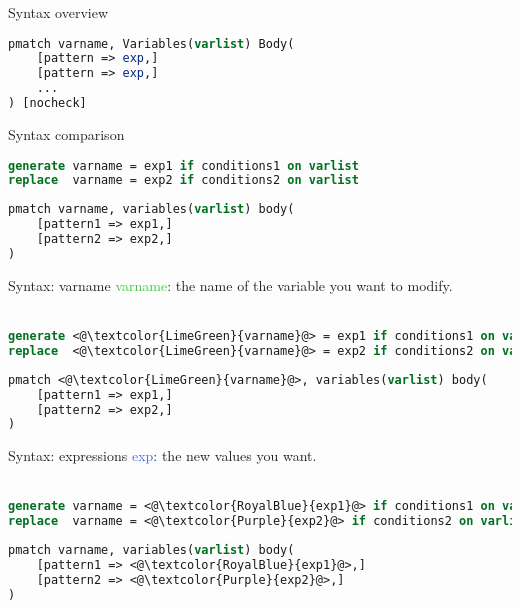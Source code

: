 \documentclass[11pt]{beamer}
\begin{document}
\begin{frame}[fragile]{Syntax overview}
\begin{lstlisting}[language=Stata]
pmatch varname, Variables(varlist) Body(
    [pattern => exp,]
    [pattern => exp,]
    ...
) [nocheck]
\end{lstlisting}
\end{frame}

\begin{frame}[fragile]{Syntax comparison}
\begin{lstlisting}[language=Stata]
generate varname = exp1 if conditions1 on varlist
replace  varname = exp2 if conditions2 on varlist
\end{lstlisting}

\begin{lstlisting}[language=Stata]
pmatch varname, variables(varlist) body(
    [pattern1 => exp1,]
    [pattern2 => exp2,]
)
\end{lstlisting}
\end{frame}

\begin{frame}[fragile]{Syntax: varname}
\textcolor{LimeGreen}{varname}: the name of the variable you want to modify. \\~

\begin{lstlisting}[language=Stata]
generate <@\textcolor{LimeGreen}{varname}@> = exp1 if conditions1 on varlist
replace  <@\textcolor{LimeGreen}{varname}@> = exp2 if conditions2 on varlist
\end{lstlisting}

\begin{lstlisting}[language=Stata]
pmatch <@\textcolor{LimeGreen}{varname}@>, variables(varlist) body(
    [pattern1 => exp1,]
    [pattern2 => exp2,]
)
\end{lstlisting}
\end{frame}

\begin{frame}[fragile]{Syntax: expressions}
\textcolor{RoyalBlue}{exp}: the new values you want. \\~

\begin{lstlisting}[language=Stata]
generate varname = <@\textcolor{RoyalBlue}{exp1}@> if conditions1 on varlist
replace  varname = <@\textcolor{Purple}{exp2}@> if conditions2 on varlist
\end{lstlisting}

\begin{lstlisting}[language=Stata]
pmatch varname, variables(varlist) body(
    [pattern1 => <@\textcolor{RoyalBlue}{exp1}@>,]
    [pattern2 => <@\textcolor{Purple}{exp2}@>,]
)
\end{lstlisting}
\end{frame}
\end{document}
